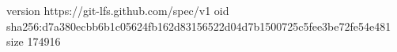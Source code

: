 version https://git-lfs.github.com/spec/v1
oid sha256:d7a380ecbb6b1c05624fb162d83156522d04d7b1500725c5fee3be72fe54e481
size 174916
